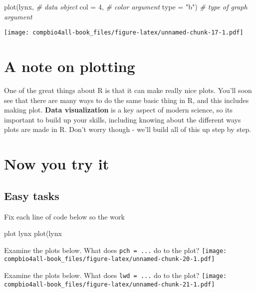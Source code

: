 \documentclass[
]{book}
\newenvironment{Shaded}{\begin{snugshade}}{\end{snugshade}}
\newcommand{\AttributeTok}[1]{\textcolor[rgb]{0.77,0.63,0.00}{#1}}
\newcommand{\CommentTok}[1]{\textcolor[rgb]{0.56,0.35,0.01}{\textit{#1}}}
\newcommand{\DecValTok}[1]{\textcolor[rgb]{0.00,0.00,0.81}{#1}}
\newcommand{\FunctionTok}[1]{\textcolor[rgb]{0.00,0.00,0.00}{#1}}
\newcommand{\NormalTok}[1]{#1}
\newcommand{\StringTok}[1]{\textcolor[rgb]{0.31,0.60,0.02}{#1}}
\begin{document}
\begin{Shaded}
\begin{Highlighting}[]
\FunctionTok{plot}\NormalTok{(lynx,          }\CommentTok{\# data object}
     \AttributeTok{col =} \DecValTok{4}\NormalTok{,       }\CommentTok{\# color argument}
     \AttributeTok{type =} \StringTok{"b"}\NormalTok{)  }\CommentTok{\# type of graph argument}
\end{Highlighting}
\end{Shaded}

\texttt{[image: compbio4all-book\_files/figure-latex/unnamed-chunk-17-1.pdf]}

\hypertarget{a-note-on-plotting}{%
\section{A note on plotting}\label{a-note-on-plotting}}

One of the great things about R is that it can make really nice plots. You'll soon see that there are many ways to do the same basic thing in R, and this includes making plot. \textbf{Data visualization} is a key aspect of modern science, so its important to build up your skills, including knowing about the different ways plots are made in R. Don't worry though - we'll build all of this up step by step.

\hypertarget{now-you-try-it}{%
\section{Now you try it}\label{now-you-try-it}}

\hypertarget{easy-tasks}{%
\subsection{Easy tasks}\label{easy-tasks}}

Fix each line of code below so the work

\begin{Shaded}
\begin{Highlighting}[]
\NormalTok{plot lynx}
\FunctionTok{plot}\NormalTok{(lynx}
\end{Highlighting}
\end{Shaded}

Examine the plots below. What does \texttt{pch\ =\ ...} do to the plot?
\texttt{[image: compbio4all-book\_files/figure-latex/unnamed-chunk-20-1.pdf]}

Examine the plots below. What does \texttt{lwd\ =\ ...} do to the plot?
\texttt{[image: compbio4all-book\_files/figure-latex/unnamed-chunk-21-1.pdf]}
\end{document}
